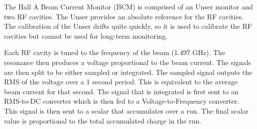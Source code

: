 The Hall A Beam Current Monitor (BCM) is comprised of an Unser monitor and two RF cavities. The Unser provides an absolute reference for the RF cavities. The calibration of the Unser drifts quite quickly, so it is used to calibrate the RF cavities but cannot be used for long-term monitoring.

Each RF cavity is tuned to the frequency of the beam (1.497 GHz). The resonance then produces a voltage proportional to the beam current. The signals are then split to be either sampled or integrated. The sampled signal outputs the RMS of the voltage over a 1 second period. This is equivalent to the average beam current for that second. The signal that is integrated is first sent to an RMS-to-DC converter which is then fed to a Voltage-to-Frequency converter. This signal is then sent to a scalar that accumulates over a run. The final scalar value is proportional to the total accumulated charge in the run.